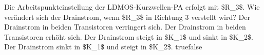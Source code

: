     {Die Arbeitspunkteinstellung der LDMOS-Kurzwellen-PA erfolgt mit \$R\_3\$. Wie verändert sich der Drainstrom, wenn \$R\_3\$ in Richtung 3 verstellt wird?}
    {Der Drainstrom in beiden Transistoren verringert sich.}
    {Der Drainstrom in beiden Transistoren erhöht sich.}
    {Der Drainstrom steigt in \$K\_1\$ und sinkt in \$K\_2\$.}
    {Der Drainstrom sinkt in \$K\_1\$ und steigt in \$K\_2\$.}
    {true}{false}